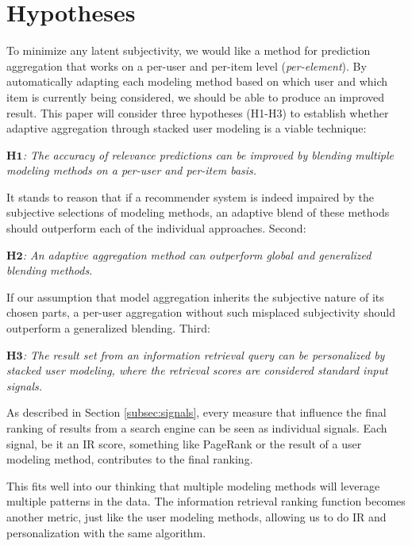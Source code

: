 \section{Hypotheses}

To minimize any latent subjectivity, we would like a method
for prediction aggregation that works on a per-user and per-item level (\emph{per-element}).
By automatically adapting each modeling method based on which user and which item is currently being
considered, we should be able to produce an improved result.
This paper will consider three hypotheses (H1-H3) 
to establish whether adaptive aggregation through stacked user modeling is a viable technique:

{
  \itshape
  $\mathbf{H1}$: The accuracy of relevance predictions can be improved
  by blending multiple modeling methods on a per-user and per-item basis.
}

It stands to reason that if a recommender system is indeed impaired
by the subjective selections of modeling methods,
an adaptive blend of these methods should outperform each of the individual approaches.
Second:

{
  \itshape
  $\mathbf{H2}$: An adaptive aggregation method can outperform global and generalized 
  blending methods.
}

If our assumption that model aggregation inherits the subjective nature of its chosen parts,
a per-user aggregation without such misplaced subjectivity should outperform a
generalized blending.
Third:

{
  \itshape
  $\mathbf{H3}$: The result set from an information retrieval query
  can be personalized by stacked user modeling, where the retrieval scores are considered 
  standard input signals.
}

As described in Section \ref{subsec:signals},
every measure that influence the final ranking of results from a search engine
can be seen as individual signals. Each signal, be it an IR score,
something like PageRank or the result of a user modeling method,
contributes to the final ranking.

This fits well into our thinking that multiple modeling methods
will leverage multiple patterns in the data.
The information retrieval ranking function
becomes another metric, just like the user modeling methods,
allowing us to do IR and personalization with the same algorithm.

\clearpage

